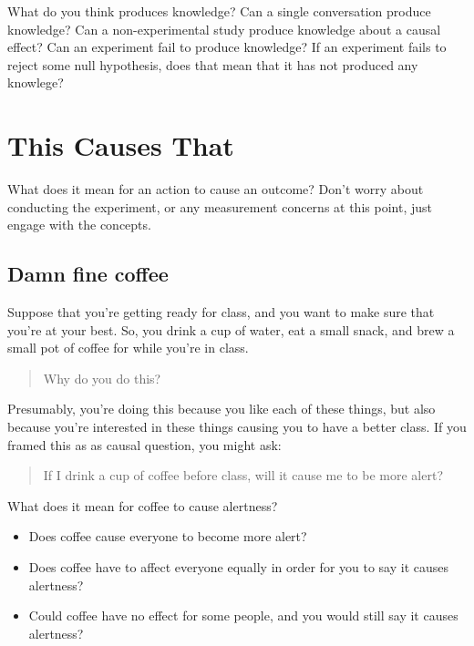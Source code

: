 \documentclass[
]{book}
\providecommand{\tightlist}{%
  \setlength{\itemsep}{0pt}\setlength{\parskip}{0pt}}
\begin{document}
What do you think produces knowledge? Can a single conversation produce
knowledge? Can a non-experimental study produce knowledge about a causal
effect? Can an experiment fail to produce knowledge? If an experiment
fails to reject some null hypothesis, does that mean that it has not
produced any knowlege?

\hypertarget{this-causes-that}{%
\section{This Causes That}\label{this-causes-that}}

What does it mean for an action to cause an outcome? Don't worry about
conducting the experiment, or any measurement concerns at this point,
just engage with the concepts.

\hypertarget{damn-fine-coffee}{%
\subsection{Damn fine coffee}\label{damn-fine-coffee}}

Suppose that you're getting ready for class, and you want to make sure
that you're at your best. So, you drink a cup of water, eat a small
snack, and brew a small pot of coffee for while you're in class.

\begin{quote}
Why do you do this?
\end{quote}

Presumably, you're doing this because you like each of these things, but
also because you're interested in these things causing you to have a
better class. If you framed this as as causal question, you might ask:

\begin{quote}
If I drink a cup of coffee before class, will it cause me to be more
alert?
\end{quote}

What does it mean for coffee to cause alertness?

\begin{itemize}
\tightlist
\item
  Does coffee cause everyone to become more alert?
\item
  Does coffee have to affect everyone equally in order for you to say it
  causes alertness?
\item
  Could coffee have no effect for some people, and you would still say
  it causes alertness?
\end{itemize}
\end{document}
